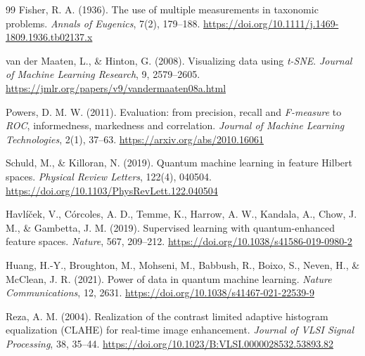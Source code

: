 \begin{thebibliography}{99}
    Fisher, R. A. (1936). The use of multiple measurements in taxonomic problems.
    \textit{Annals of Eugenics}, 7(2), 179--188.
    \url{https://doi.org/10.1111/j.1469-1809.1936.tb02137.x}

    van der Maaten, L., \& Hinton, G. (2008). Visualizing data using \textit{t-SNE}.
    \textit{Journal of Machine Learning Research}, 9, 2579--2605.
    \url{https://jmlr.org/papers/v9/vandermaaten08a.html}

    Powers, D. M. W. (2011). Evaluation: from precision, recall and \textit{F-measure} to \textit{ROC}, informedness, markedness and correlation.
    \textit{Journal of Machine Learning Technologies}, 2(1), 37--63.
    \url{https://arxiv.org/abs/2010.16061}

    Schuld, M., \& Killoran, N. (2019). Quantum machine learning in feature {H}ilbert spaces.
    \textit{Physical Review Letters}, 122(4), 040504.
    \url{https://doi.org/10.1103/PhysRevLett.122.040504}

    Havl{\'{i}}{\v{c}}ek, V., C{\'{o}}rcoles, A. D., Temme, K., Harrow, A. W., Kandala, A., Chow, J. M., \& Gambetta, J. M. (2019). Supervised learning with quantum-enhanced feature spaces.
    \textit{Nature}, 567, 209--212.
    \url{https://doi.org/10.1038/s41586-019-0980-2}

    Huang, H.-Y., Broughton, M., Mohseni, M., Babbush, R., Boixo, S., Neven, H., \& McClean, J. R. (2021). Power of data in quantum machine learning.
    \textit{Nature Communications}, 12, 2631.
    \url{https://doi.org/10.1038/s41467-021-22539-9}

    Reza, A. M. (2004). Realization of the contrast limited adaptive histogram equalization (CLAHE) for real-time image enhancement.
    \textit{Journal of VLSI Signal Processing}, 38, 35--44.
    \url{https://doi.org/10.1023/B:VLSI.0000028532.53893.82}


\end{thebibliography}
